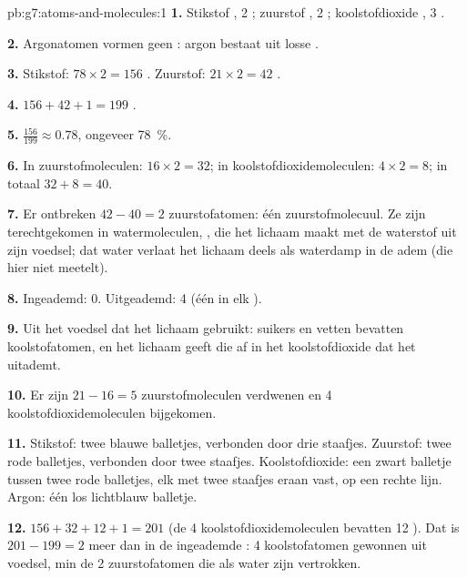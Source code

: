 \begin{solution}{pb:g7:atoms-and-molecules:1}
\textbf{1.} Stikstof , 2 ; zuurstof , 2 ;
koolstofdioxide , 3 .

\textbf{2.} Argonatomen vormen geen : argon bestaat uit losse
.

\textbf{3.} Stikstof: $78 \times 2 = 156$ . Zuurstof: $21\times 2 =
42$ .

\textbf{4.} $156 + 42 + 1 = 199$ .

\textbf{5.} $\frac{156}{199} \approx 0.78$, ongeveer \qty{78}{\percent}.

\textbf{6.} In zuurstofmoleculen: $16\times 2 = 32$; in
koolstofdioxidemoleculen: $4 \times 2 = 8$; in totaal $32 + 8 = 40$.

\textbf{7.} Er ontbreken $42 - 40 = 2$ zuurstofatomen: één
zuurstofmolecuul. Ze zijn terechtgekomen in watermoleculen, , die
het lichaam maakt met de waterstof uit zijn voedsel; dat water verlaat
het lichaam deels als waterdamp in de adem (die hier niet meetelt).

\textbf{8.} Ingeademd: 0. Uitgeademd: 4 (één in elk ).

\textbf{9.} Uit het voedsel dat het lichaam gebruikt: suikers en vetten
bevatten koolstofatomen, en het lichaam geeft die af in het
koolstofdioxide dat het uitademt.

\textbf{10.} Er zijn $21 - 16 = 5$ zuurstofmoleculen verdwenen en 4
koolstofdioxidemoleculen bijgekomen.

\textbf{11.} Stikstof: twee blauwe balletjes, verbonden door drie
staafjes. Zuurstof: twee rode balletjes, verbonden door twee staafjes.
Koolstofdioxide: een zwart balletje tussen twee rode balletjes, elk met
twee staafjes eraan vast, op een rechte lijn. Argon: één los lichtblauw
balletje.

\textbf{12.} $156 + 32 + 12 + 1 = 201$  (de 4
koolstofdioxidemoleculen bevatten 12 ). Dat is $201 - 199 = 2$
 meer dan in de ingeademde : 4 koolstofatomen gewonnen uit
voedsel, min de 2 zuurstofatomen die als water zijn vertrokken.
\end{solution}

